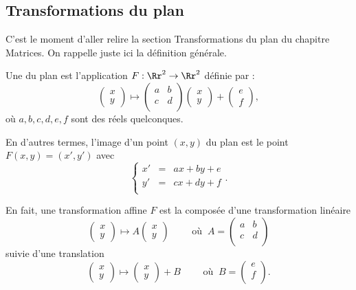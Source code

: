 \documentclass[11pt,class=report,crop=false]{standalone}
\begin{document}
\subsection{Transformations du plan}

C'est le moment d'aller relire la section \og{}Transformations du plan\fg{} du chapitre \og{}Matrices\fg{}. On rappelle juste ici la définition générale.

Une  du plan est l'application $F : \Rr^2 \to \Rr^2$ définie par :
$$
\begin{pmatrix}x \\ y \end{pmatrix} \mapsto \begin{pmatrix}a & b \\ c & d \\  \end{pmatrix}
\begin{pmatrix}x \\ y \end{pmatrix} +\begin{pmatrix} e \\ f \end{pmatrix},$$
où $a,b,c,d, e, f$ sont des réels quelconques.

En d'autres termes, l'image d'un point $(x,y)$ du plan
est le point $F(x,y) = (x',y')$ avec
$$\left \{
\begin{array}{rcl}
    x' &=& ax + by + e \\
    y' &=& cx + dy + f \\
\end{array}
\right..$$

En fait, une transformation affine $F$ est la composée d'une transformation
linéaire 
$$
\begin{pmatrix}x \\ y \end{pmatrix} \mapsto A \begin{pmatrix}x \\ y \end{pmatrix} \qquad \text{ où } \  A =\begin{pmatrix}a & b \\ c & d \\  \end{pmatrix}$$
suivie d'une translation 
$$
\begin{pmatrix}x \\ y \end{pmatrix} \mapsto \begin{pmatrix}x \\ y \end{pmatrix} + B  \qquad \text{ où } \ B =\begin{pmatrix} e \\ f \\  \end{pmatrix}.$$
\end{document}
